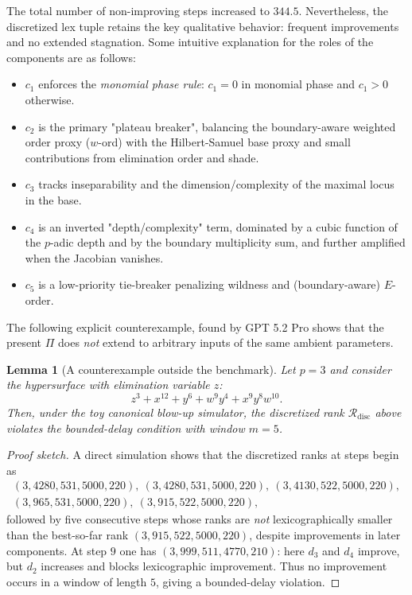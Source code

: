 \documentclass[11pt]{amsart}
\newtheorem{lemma}{Lemma}
\begin{document}
The total number of non-improving steps increased to $344.5$. Nevertheless, the discretized lex tuple retains the key qualitative behavior: frequent improvements and no extended stagnation. Some intuitive explanation for the roles of the components are as follows:
\begin{itemize}[leftmargin=*]
\item $c_1$ enforces the \emph{monomial phase rule}: $c_1=0$ in monomial phase and $c_1>0$ otherwise.
\item $c_2$ is the primary "plateau breaker", balancing the boundary-aware weighted order proxy
($w$-ord) with the Hilbert-Samuel base proxy and small contributions from elimination order and shade.
\item $c_3$ tracks inseparability and the dimension/complexity of the maximal locus in the base.
\item $c_4$ is an inverted "depth/complexity" term, dominated by a cubic function of the $p$-adic
depth and by the boundary multiplicity sum, and further amplified when the Jacobian vanishes.
\item $c_5$ is a low-priority tie-breaker penalizing wildness and (boundary-aware) $E$-order.
\end{itemize}


The following explicit counterexample, found by GPT 5.2 Pro shows that the present
$\Pi$ does \emph{not} extend to arbitrary inputs of the same ambient parameters.

\begin{lemma}[A counterexample outside the benchmark]\label{thm:counterexample}
Let $p=3$ and consider the hypersurface with elimination variable $z$:
\[
z^3 + x^{12} + y^{6} + w^{9}y^{4} + x^{9}y^{8}w^{10}.
\]
Then, under the toy canonical blow-up simulator, the discretized rank
$\mathcal R_{\mathrm{disc}}$ above violates the bounded-delay condition with window $m=5$.
\end{lemma}

\begin{proof}[Proof sketch]
A direct simulation shows that the discretized ranks at steps begin as
\begin{multline}
(3,4280,531,5000,220),\ (3,4280,531,5000,220),\ (3,4130,522,5000,220),\\ \nonumber (3,965,531,5000,220),\ (3,915,522,5000,220),
\end{multline}
followed by five consecutive steps whose ranks are \emph{not} lexicographically smaller than the
best-so-far rank $(3,915,522,5000,220)$, despite improvements in later components.
At step $9$ one has $(3,999,511,4770,210)$: here $d_3$ and $d_4$ improve, but $d_2$ increases and blocks
lexicographic improvement.
Thus no improvement occurs in a window of length $5$, giving a bounded-delay violation.
\end{proof}
\end{document}
